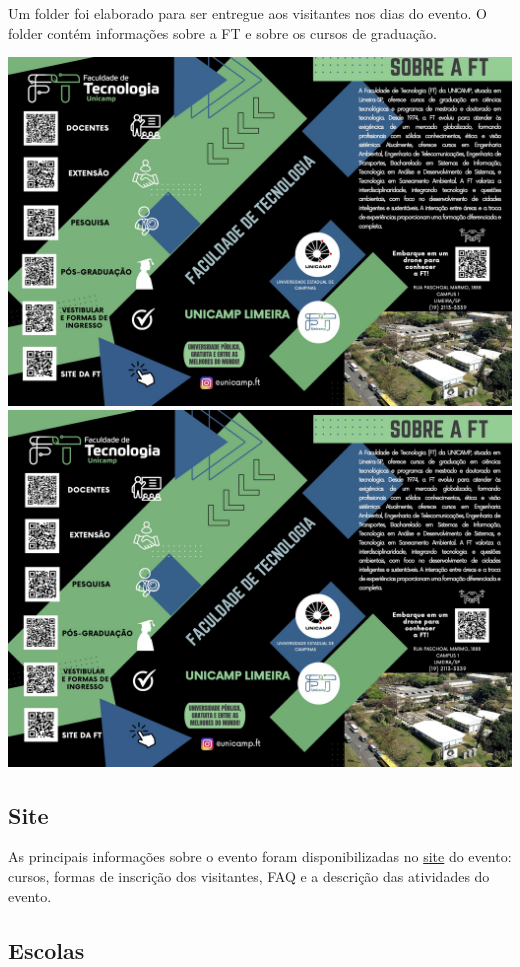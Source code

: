 \documentclass[
  letterpaper,
  DIV=11,
  numbers=noendperiod]{scrreprt}
\begin{document}
Um folder foi elaborado para ser entregue aos visitantes nos dias do
evento. O folder contém informações sobre a FT e sobre os cursos de
graduação.

\includegraphics[width=0.9\linewidth,height=\textheight,keepaspectratio]{planejamento/folder-1.jpg}
\includegraphics[width=0.9\linewidth,height=\textheight,keepaspectratio]{planejamento/folder-2.jpg}

\subsection{Site}\label{site}

As principais informações sobre o evento foram disponibilizadas no
\href{https://wordpress.ft.unicamp.br/ftpa/}{site} do evento: cursos,
formas de inscrição dos visitantes, FAQ e a descrição das atividades do
evento.

\subsection{Escolas}\label{escolas}
\end{document}
